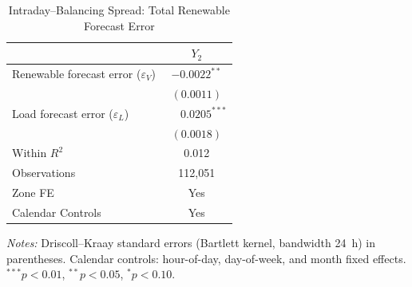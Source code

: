 \begin{table}[htbp]
\centering
\caption{Intraday--Balancing Spread: Total Renewable Forecast Error}
\label{tab:r4_totalv}
\begin{threeparttable}
\begin{tabularx}{\linewidth}{>{\raggedright\arraybackslash}Xc}
\toprule
 & $Y_2$ \\
\midrule
Renewable forecast error ($\varepsilon_V$) & $-0.0022^{**}$ \\
 & $(0.0011)$ \\[0.4ex]
Load forecast error ($\varepsilon_L$) & $\phantom{-}0.0205^{***}$ \\
 & $(0.0018)$ \\
\midrule
Within $R^2$ & 0.012 \\
Observations & 112,051 \\
Zone FE & Yes \\
Calendar Controls & Yes \\
\bottomrule
\end{tabularx}
\begin{tablenotes}[flushleft]
\footnotesize
\item \textit{Notes:} Driscoll--Kraay standard errors (Bartlett kernel, bandwidth 24~h) in parentheses. Calendar controls: hour-of-day, day-of-week, and month fixed effects. $^{***}p<0.01$, $^{**}p<0.05$, $^{*}p<0.10$.
\end{tablenotes}
\end{threeparttable}
\end{table}

